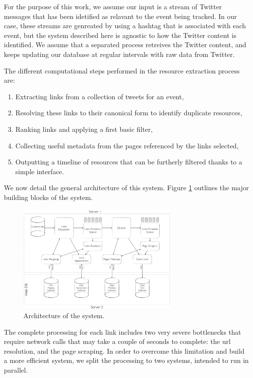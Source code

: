 \documentclass{sig-alternate}
\begin{document}
For the purpose of this work, we assume our input is a stream of Twitter messages that has been idetified as relavant to the event being tracked. In our case, these streams are genreated by using a hashtag that is associated with each event, but the system described here is agnostic to how the Twitter content is identified. We assume that a separated process retreives the Twitter content, and keeps updating our database at regular intervals with raw data from Twitter. 


The different computational steps performed in the resource extraction process are:
\begin{enumerate}
 \item Extracting links from a collection of tweets for an event,
 \item Resolving these links to their canonical form to identify duplicate resources,
 \item Ranking links and applying a first basic filter,
 \item Collecting useful metadata from the pages referenced by the links selected,
 \item Outputting a timeline of resources that can be furtherly filtered thanks to a simple interface.
\end{enumerate}

We now detail the general architecture of this system. Figure \ref{fig:architecture} outlines the major building blocks of the system.
\begin{figure}[htbp]
  \centering
  \includegraphics[width=8cm]{Figures/links_processing_architecture.png}
  \caption{Architecture of the system.}
  \label{fig:architecture}
\end{figure}

The complete processing for each link includes two very severe bottlenecks that require network calls that may take a couple of seconds to complete: the url resolution, and the page scraping. In order to overcome this limitation and build a more efficient system, we split the processing to two systems, intended to run in parallel.
\end{document}
